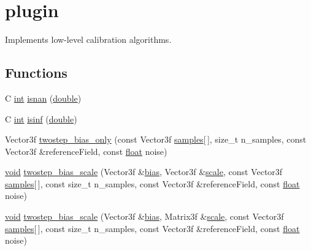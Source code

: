 \hypertarget{group___config}{\section{plugin}
\label{group___config}
}


Implements low-\/level calibration algorithms.  


\subsection*{Functions}
\begin{DoxyCompactItemize}
\item 
C \hyperlink{ioapi_8h_a787fa3cf048117ba7123753c1e74fcd6}{int} \hyperlink{group___config_ga9739bd10b55fe3bf60748adb6e3b1e27}{isnan} (\hyperlink{_super_l_u_support_8h_a8956b2b9f49bf918deed98379d159ca7}{double})
\item 
C \hyperlink{ioapi_8h_a787fa3cf048117ba7123753c1e74fcd6}{int} \hyperlink{group___config_ga7e00132f340b91558ae199ea563de81b}{isinf} (\hyperlink{_super_l_u_support_8h_a8956b2b9f49bf918deed98379d159ca7}{double})
\item 
Vector3f \hyperlink{group___config_ga01970f12c529e37db9f7e4ea0099b038}{twostep\-\_\-bias\-\_\-only} (const Vector3f \hyperlink{glext_8h_aba70cd077c2c52c15358c231c6d293aa}{samples}\mbox{[}$\,$\mbox{]}, size\-\_\-t n\-\_\-samples, const Vector3f \&reference\-Field, const \hyperlink{_super_l_u_support_8h_a6a1bb6ed41f44b60e7bd83b0e9945aa7}{float} noise)
\item 
\hyperlink{group___u_a_v_objects_plugin_ga444cf2ff3f0ecbe028adce838d373f5c}{void} \hyperlink{group___config_gaeadf339a179257ec1a940f8e0c29fe29}{twostep\-\_\-bias\-\_\-scale} (Vector3f \&\hyperlink{glext_8h_a39c3ffa18f420251c5d132dd8c1c6137}{bias}, Vector3f \&\hyperlink{glext_8h_a281421b881aa7a1266842b73a3bc7655}{scale}, const Vector3f \hyperlink{glext_8h_aba70cd077c2c52c15358c231c6d293aa}{samples}\mbox{[}$\,$\mbox{]}, const size\-\_\-t n\-\_\-samples, const Vector3f \&reference\-Field, const \hyperlink{_super_l_u_support_8h_a6a1bb6ed41f44b60e7bd83b0e9945aa7}{float} noise)
\item 
\hyperlink{group___u_a_v_objects_plugin_ga444cf2ff3f0ecbe028adce838d373f5c}{void} \hyperlink{group___config_ga2730cf74cc141a73bf523a0ea259400a}{twostep\-\_\-bias\-\_\-scale} (Vector3f \&\hyperlink{glext_8h_a39c3ffa18f420251c5d132dd8c1c6137}{bias}, Matrix3f \&\hyperlink{glext_8h_a281421b881aa7a1266842b73a3bc7655}{scale}, const Vector3f \hyperlink{glext_8h_aba70cd077c2c52c15358c231c6d293aa}{samples}\mbox{[}$\,$\mbox{]}, const size\-\_\-t n\-\_\-samples, const Vector3f \&reference\-Field, const \hyperlink{_super_l_u_support_8h_a6a1bb6ed41f44b60e7bd83b0e9945aa7}{float} noise)
\end{DoxyCompactItemize}



